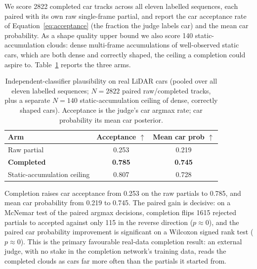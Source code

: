 We score \num{2822} completed car tracks across all eleven labelled sequences, each paired
with its own raw single-frame partial, and report the car acceptance rate of
Equation~\eqref{eq:acceptance} (the fraction the judge labels car) and the mean car probability. As a shape quality upper bound we also score
\num{140} static-accumulation clouds: dense multi-frame accumulations of well-observed
static cars, which are both dense and correctly shaped, the ceiling a completion could aspire
to. Table~\ref{tab:plausibility} reports the three arms.

\begin{table}[H]
  \centering
  \caption[Independent-classifier plausibility of completed cars]{Independent-classifier
    plausibility on real LiDAR cars (pooled over all eleven labelled sequences;
    $N=\num{2822}$ paired raw/completed tracks, plus a separate $N=\num{140}$
    static-accumulation ceiling of dense, correctly shaped cars). Acceptance is the judge's
    car argmax rate; car probability its mean car posterior.}
  \label{tab:plausibility}
  \begin{tabular}{lcc}
    \toprule
    Arm & Acceptance $\uparrow$ & Mean car prob $\uparrow$ \\
    \midrule
    Raw partial            & 0.253          & 0.219 \\
    \textbf{Completed}     & \textbf{0.785} & \textbf{0.745} \\
    Static-accumulation ceiling & 0.807     & 0.728 \\
    \bottomrule
  \end{tabular}
\end{table}

Completion raises car acceptance from \num{0.253} on the raw partials to \num{0.785}, and
mean car probability from \num{0.219} to \num{0.745}. The paired gain is decisive: on a
McNemar test of the paired argmax decisions, completion flips \num{1615} rejected partials
to accepted against only \num{115} in the reverse direction ($p\approx0$), and the paired
car probability improvement is significant on a Wilcoxon signed rank test ($p\approx0$).
This is the primary favourable real-data completion result: an external judge, with no stake
in the completion network's training data, reads the completed clouds as cars far more often
than the partials it started from.

